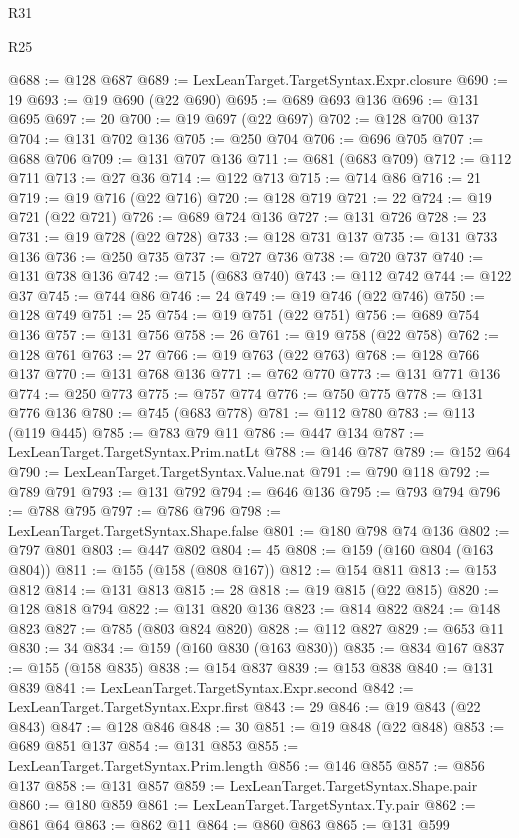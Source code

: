 \begin{lexlean}{R31}
\begin{lexlean}{R25}
\begin{coremodule}
{{{{{{{{{{{{{{{{{{{{{{{{{{{{{{{{{{{{{{{{{{{{{{{{{{{{{{{{{{{{{{{{{{{{{{{{{{{{{{{{{{{{{{{{{{{{{{{{{{{{{{{{{{{{{{{{{{{{{{{{{{{{{{{{{{{{{{{{{{{{{{{{{{{{{{{{{{{{{{{{{{{{{{{{{{{{{{{{{{{{{{{{{{{{{{{{{{{{{{{@688 := @128 @687
@689 := LexLeanTarget.TargetSyntax.Expr.closure
@690 := 19
@693 := @19 @690 (@22 @690)
@695 := @689 @693 @136
@696 := @131 @695
@697 := 20
@700 := @19 @697 (@22 @697)
@702 := @128 @700 @137
@704 := @131 @702 @136
@705 := @250 @704
@706 := @696 @705
@707 := @688 @706
@709 := @131 @707 @136
@711 := @681 (@683 @709)
@712 := @112 @711
@713 := @27 @36
@714 := @122 @713
@715 := @714 @86
@716 := 21
@719 := @19 @716 (@22 @716)
@720 := @128 @719
@721 := 22
@724 := @19 @721 (@22 @721)
@726 := @689 @724 @136
@727 := @131 @726
@728 := 23
@731 := @19 @728 (@22 @728)
@733 := @128 @731 @137
@735 := @131 @733 @136
@736 := @250 @735
@737 := @727 @736
@738 := @720 @737
@740 := @131 @738 @136
@742 := @715 (@683 @740)
@743 := @112 @742
@744 := @122 @37
@745 := @744 @86
@746 := 24
@749 := @19 @746 (@22 @746)
@750 := @128 @749
@751 := 25
@754 := @19 @751 (@22 @751)
@756 := @689 @754 @136
@757 := @131 @756
@758 := 26
@761 := @19 @758 (@22 @758)
@762 := @128 @761
@763 := 27
@766 := @19 @763 (@22 @763)
@768 := @128 @766 @137
@770 := @131 @768 @136
@771 := @762 @770
@773 := @131 @771 @136
@774 := @250 @773
@775 := @757 @774
@776 := @750 @775
@778 := @131 @776 @136
@780 := @745 (@683 @778)
@781 := @112 @780
@783 := @113 (@119 @445)
@785 := @783 @79 @11
@786 := @447 @134
@787 := LexLeanTarget.TargetSyntax.Prim.natLt
@788 := @146 @787
@789 := @152 @64
@790 := LexLeanTarget.TargetSyntax.Value.nat
@791 := @790 @118
@792 := @789 @791
@793 := @131 @792
@794 := @646 @136
@795 := @793 @794
@796 := @788 @795
@797 := @786 @796
@798 := LexLeanTarget.TargetSyntax.Shape.false
@801 := @180 @798 @74 @136
@802 := @797 @801
@803 := @447 @802
@804 := 45
@808 := @159 (@160 @804 (@163 @804))
@811 := @155 (@158 (@808 @167))
@812 := @154 @811
@813 := @153 @812
@814 := @131 @813
@815 := 28
@818 := @19 @815 (@22 @815)
@820 := @128 @818 @794
@822 := @131 @820 @136
@823 := @814 @822
@824 := @148 @823
@827 := @785 (@803 @824 @820)
@828 := @112 @827
@829 := @653 @11
@830 := 34
@834 := @159 (@160 @830 (@163 @830))
@835 := @834 @167
@837 := @155 (@158 @835)
@838 := @154 @837
@839 := @153 @838
@840 := @131 @839
@841 := LexLeanTarget.TargetSyntax.Expr.second
@842 := LexLeanTarget.TargetSyntax.Expr.first
@843 := 29
@846 := @19 @843 (@22 @843)
@847 := @128 @846
@848 := 30
@851 := @19 @848 (@22 @848)
@853 := @689 @851 @137
@854 := @131 @853
@855 := LexLeanTarget.TargetSyntax.Prim.length
@856 := @146 @855
@857 := @856 @137
@858 := @131 @857
@859 := LexLeanTarget.TargetSyntax.Shape.pair
@860 := @180 @859
@861 := LexLeanTarget.TargetSyntax.Ty.pair
@862 := @861 @64
@863 := @862 @11
@864 := @860 @863
@865 := @131 @599
}}}}}}}}}}}}}}}}}}}}}}}}}}}}}}}}}}}}}}}}}}}}}}}}}}}}}}}}}}}}}}}}}}}}}}}}}}}}}}}}}}}}}}}}}}}}}}}}}}}}}}}}}}}}}}}}}}}}}}}}}}}}}}}}}}}}}}}}}}}}}}}}}}}}}}}}}}}}}}}}}}}}}}}}}}}}}}}}}}}}}}}}}}}}}}}}}}}}}}}
\end{coremodule}
\end{lexlean}
\end{lexlean}
